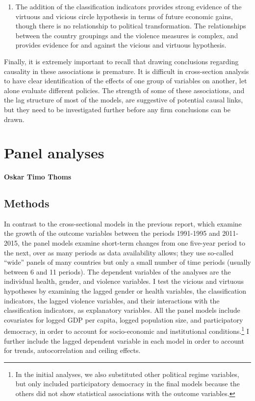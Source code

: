 \documentclass[12pt]{article}
\begin{document}
\begin{enumerate}
\item The addition of the classification indicators provides strong evidence of the virtuous and vicious circle hypothesis in terms of future economic gains, though there is no relationship to political transformation. The relationships between the country groupings and the violence measures is complex, and provides evidence for and against the vicious and virtuous hypothesis.
\end{enumerate}

Finally, it is extremely important to recall that drawing conclusions regarding causality in these associations is premature. It is difficult in cross-section analysis to have clear identification of the effects of one group of variables on another, let alone evaluate different policies. The strength of some of these associations, and the lag structure of most of the models, are suggestive of potential causal links, but they need to be investigated further before any firm conclusions can be drawn.

\section{Panel analyses}
\label{panel}
\paragraph{Oskar Timo Thoms}

\subsection{Methods}
\label{methods}

In contrast to the cross-sectional models in the previous report, which examine the growth of the outcome variables between the periods 1991-1995 and 2011-2015, the panel models examine short-term changes from one five-year period to the next, over as many periods as data availability allows; they use so-called \enquote{wide} panels of many countries but only a small number of time periods (usually between 6 and 11 periods).
The dependent variables of the analyses are the individual health, gender, and violence variables.
I test the vicious and virtuous hypotheses by examining the lagged gender or health variables, the classification indicators, the lagged violence variables, and their interactions with the classification indicators, as explanatory variables.
All the panel models include covariates for logged GDP per capita, logged population size, and participatory democracy, in order to account for socio-economic and institutional conditions.\footnote{
In the initial analyses, we also substituted other political regime variables, but only included participatory democracy in the final models because the others did not show statistical associations with the outcome variables.}
I further include the lagged dependent variable in each model in order to account for trends, autocorrelation and ceiling effects.
\end{document}
